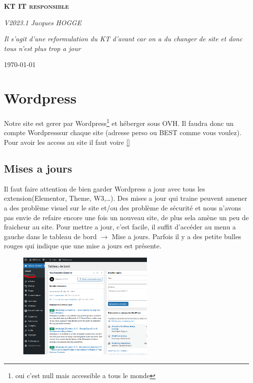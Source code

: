 \documentclass[12pt]{article}
\begin{document}
\begin{titlepage}
	\centering
	
	
	\vspace{0.5cm}
	{\Large \scshape\bfseries KT IT responsible}
	\vspace{0.5cm}

	{ \Huge }
	

	{\itshape V2023.1 \large  Jacques HOGGE \par}
	\vspace{5cm}
	
	
	\textit{Il s'agit d'une reformulation du KT d'avant car on a du changer de site et donc tous n'est plus trop a jour}
	

	\vfill
	
    {\Large  \today}
\end{titlepage}
\newpage

\section{Wordpress}\label{Wordpress}
	Notre site est gerer par Wordpress\footnote{oui c'est null mais accessible a tous le monde} et héberger sous OVH. Il faudra donc un compte Wordpresssur chaque site (adresse perso ou BEST comme vous voulez). Pour avoir les access au site il faut voire \autoref{}
	
	\subsection{Mises a jours}
		Il faut faire attention de bien garder Wordpress a jour avec tous les extension(Elementor, Theme, W3,\dots). Des mises a jour qui traine peuvent amener a des problème visuel sur le site et/ou des problème de sécurité et nous n'avons pas envie de refaire encore une fois un nouveau site, de plus sela amène un peu de fraicheur au site. Pour mettre a jour, c'est facile, il suffit d'accéder au menu a gauche dans le tableau de bord $\rightarrow$ Mise a jours. Parfois il y a des petite bulles rouges qui indique que une mise a jours est présente.
		\begin{figure}[htp]
			\centering
			\includegraphics[width=0.6\textwidth]{img/MiseAJours.png}
		\end{figure}
		
\end{document}
